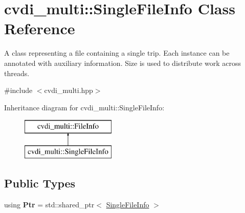 \hypertarget{classcvdi__multi_1_1SingleFileInfo}{}\section{cvdi\+\_\+multi\+:\+:Single\+File\+Info Class Reference}
\label{classcvdi__multi_1_1SingleFileInfo}


A class representing a file containing a single trip. Each instance can be annotated with auxiliary information. Size is used to distribute work across threads.  




{\ttfamily \#include $<$cvdi\+\_\+multi.\+hpp$>$}

Inheritance diagram for cvdi\+\_\+multi\+:\+:Single\+File\+Info\+:\begin{figure}[H]
\begin{center}
\leavevmode
\includegraphics[height=2.000000cm]{classcvdi__multi_1_1SingleFileInfo}
\end{center}
\end{figure}
\subsection*{Public Types}
\begin{DoxyCompactItemize}
\item 
using {\bfseries Ptr} = std\+::shared\+\_\+ptr$<$ \hyperlink{classcvdi__multi_1_1SingleFileInfo}{Single\+File\+Info} $>$\hypertarget{classcvdi__multi_1_1SingleFileInfo_a834ecd875a2083ef98c83f136e606711}{}\label{classcvdi__multi_1_1SingleFileInfo_a834ecd875a2083ef98c83f136e606711}

\end{DoxyCompactItemize}
